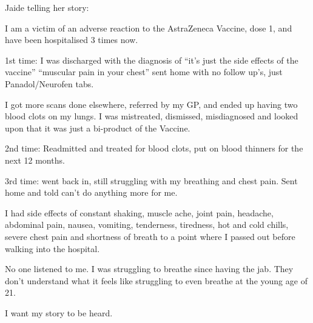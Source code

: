 Jaide telling her story:

I am a victim of an adverse reaction to the AstraZeneca Vaccine, dose 1, and
have been hospitalised 3 times now.

1st time: I was discharged with the diagnosis of “it’s just the side effects of
the vaccine” “muscular pain in your chest” sent home with no follow up’s, just
Panadol/Neurofen tabs.

I got more scans done elsewhere, referred by my GP, and ended up having two
blood clots on my lungs. I was mistreated, dismissed, misdiagnosed and looked
upon that it was just a bi-product of the Vaccine.

2nd time: Readmitted and treated for blood clots, put on blood thinners for the
next 12 months.

3rd time: went back in, still struggling with my breathing and chest pain. Sent
home and told can’t do anything more for me.

I had side effects of constant shaking, muscle ache, joint pain, headache,
abdominal pain, nausea, vomiting, tenderness, tiredness, hot and cold chills,
severe chest pain and shortness of breath to a point where I passed out before
walking into the hospital.

No one listened to me. I was struggling to breathe since having the jab. They
don’t understand what it feels like struggling to even breathe at the young age
of 21.

I want my story to be heard.

